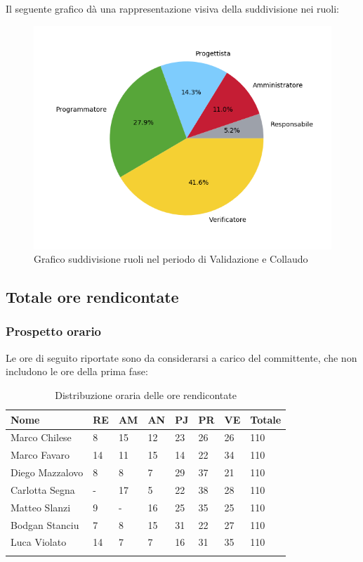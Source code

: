 Il seguente grafico dà una rappresentazione visiva della suddivisione nei ruoli:
\begin{figure}[H]
	\centering
	\includegraphics[width=0.8\linewidth]{./images/torta_vc.png}
	\caption{Grafico suddivisione ruoli nel periodo di Validazione e Collaudo}
	\label{fig:grafico suddivione ruoli periodo di Validazione e collaudo}
\end{figure}

\newpage

\subsection{Totale ore rendicontate}
\subsubsection{Prospetto orario}

Le ore di seguito riportate sono da considerarsi a carico del committente, che non includono le ore della prima fase:

\begin{longtable}{|C{.30\textwidth}|C{.06\textwidth}|C{.06\textwidth}|C{.06\textwidth} | C{.06\textwidth}| C{.06\textwidth} | C{.06\textwidth} | C{.10\textwidth} |}
\hline
\textbf{Nome} & \textbf{RE} & \textbf{AM} & \textbf{AN} & \textbf{PJ} & \textbf{PR} & \textbf{VE} & \textbf{Totale}\\
\hline 
Marco Chilese & 8 & 15 & 12 & 23 & 26 & 26 & 110\\
\hline
Marco Favaro & 14 & 11 & 15 & 14 & 22 & 34 & 110\\
\hline
Diego Mazzalovo & 8 & 8 & 7 & 29 & 37 & 21 & 110\\
\hline
Carlotta Segna & - & 17 & 5 & 22 & 38 & 28 & 110\\
\hline
Matteo Slanzi & 9 & - & 16 & 25 & 35 & 25 & 110\\
\hline
Bodgan Stanciu & 7 & 8 & 15 & 31 & 22 & 27 & 110\\
\hline
Luca Violato & 14 & 7 & 7 & 16 & 31 & 35 & 110 \\
\hline

\caption{Distribuzione oraria delle ore rendicontate}
\label{Distribuzione oraria delle ore rendicontate}
\end{longtable}


